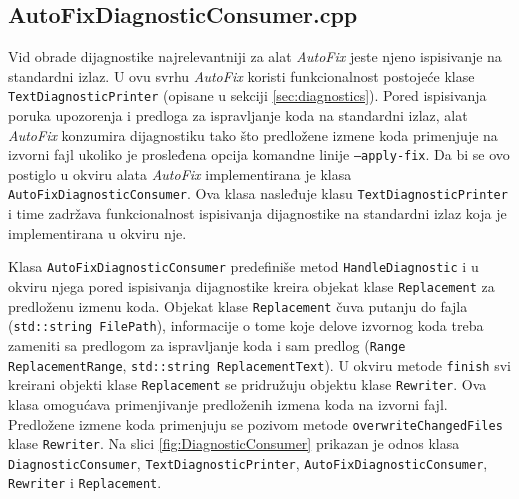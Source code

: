 \documentclass[12pt,oneside]{memoir}
\begin{document}
\subsection{AutoFixDiagnosticConsumer.cpp}
Vid obrade dijagnostike najrelevantniji za alat \textit{AutoFix} jeste njeno ispisivanje na standardni izlaz. U ovu 
svrhu \textit{AutoFix} koristi funkcionalnost postoje\'{c}e klase \texttt{TextDiagnosticPrinter} (opisane u sekciji \ref{sec:diagnostics}).
Pored ispisivanja poruka upozorenja i predloga za ispravljanje koda na standardni izlaz, alat \textit{AutoFix} konzumira dijagnostiku tako \v{s}to predlo\v{z}ene izmene koda primenjuje na izvorni fajl ukoliko je prosleđena opcija komandne linije \texttt{--apply-fix}.
Da bi se ovo postiglo u okviru alata \textit{AutoFix} implementirana je klasa \texttt{AutoFix\-DiagnosticConsumer}. Ova klasa nasleđuje
klasu \texttt{TextDiagnosticPrinter} i time zadr\v{z}ava funkcionalnost ispisivanja dijagnostike na standardni izlaz koja je implementirana u okviru nje. \par Klasa \texttt{AutoFixDiagnosticConsumer} predefini\v{s}e metod \texttt{HandleDiag\-nostic} i u okviru njega pored ispisivanja dijagnostike kreira objekat klase \texttt{Replace\-ment} za predlo\v{z}enu izmenu koda. Objekat klase \texttt{Replacement} \v{c}uva putanju do fajla (\texttt{std::\-string FilePath}), informacije o tome koje delove izvornog koda treba zameniti sa predlogom za ispravljanje koda i sam predlog (\texttt{Range ReplacementRange}, \texttt{std::string ReplacementText}).
U okviru metode \texttt{finish} svi kreirani objekti klase \texttt{Replacement} se pridru\v{z}uju objektu klase \texttt{Rewriter}.
Ova klasa omogu\'{c}ava primenjivanje predlo\v{z}enih izmena koda na izvorni fajl. Predlo\v{z}ene izmene koda primenjuju se pozivom metode \texttt{overwriteChangedFiles} klase \texttt{Rewriter}. Na slici \ref{fig:DiagnosticConsumer} prikazan je odnos klasa \texttt{DiagnosticConsumer}, \texttt{TextDiagnosticPrinter}, \texttt{AutoFixDiagnosticConsumer}, \texttt{Rewriter} i \texttt{Replacement}.
\end{document}
